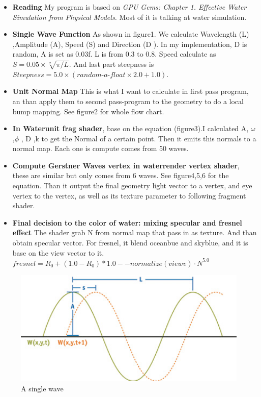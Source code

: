 \documentclass[12pt,letterpaper]{article}
\begin{document}
\begin{itemize}
\item \textbf{Reading} My program is based on \textit{GPU Gems: Chapter 1. Effective Water Simulation from Physical Models.} Most of it is talking at water simulation. 
\item \textbf{Single Wave Function} As shown in figure1. We calculate Wavelength (L) ,Amplitude (A), Speed (S) and Direction (D ). In my implementation, D is random, A is set as 0.03f. L is from 0.3 to 0.8. Speed calculate as $S = 0.05 \times \sqrt[2]{\pi/L}$. And last part steepness is $ Steepness = 5.0\times (\textit{random-a-float}\times 2.0+1.0)$.

\item \textbf{Unit Normal Map} This is what I want to calculate in first pass program, an than apply them to second pass-program to the geometry to do a local bump mapping. See figure2 for whole flow chart.
\item \textbf{In Waterunit frag shader}, base on the equation (figure3).I calculated A, $\omega$ ,$\phi$ , D ,k to get the Normal of a certain point. Then it emits this normals to a normal map. Each one is compute comes from 50 waves.
\item \textbf{Compute Gerstner Waves vertex in waterrender vertex shader}, these are similar but only comes from 6 waves. See figure4,5,6 for the equation. Than it output the final geometry light vector to a vertex, and eye vertex to the vertex, as well as its texture parameter to following fragment shader.
\item \textbf{Final decision to the color of water: mixing specular and fresnel effect} The shader grab N from normal map that pass in as texture. And than obtain specular vector. For fresnel, it blend oceanbue and skyblue, and it is base on the view vector to it.$fresnel = R_{0} + (1.0 - R_{0}) * {1.0 - {-normalize(viewv)}\cdot {N}}^{5.0}$


\end{itemize}
\begin{figure}[p]
    \centering
    \includegraphics[width=1.0\textwidth]{fig1.jpg}
    \caption{A single wave}
\end{figure}
\end{document}
